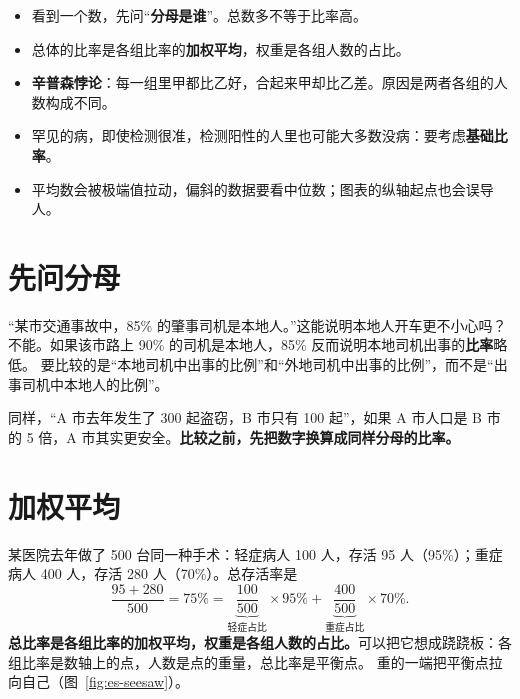 
\begin{keypoints}
\begin{itemize}
  \item 看到一个数，先问“\textbf{分母是谁}”。总数多不等于比率高。
  \item 总体的比率是各组比率的\textbf{加权平均}，权重是各组人数的占比。
  \item \textbf{辛普森悖论}：每一组里甲都比乙好，合起来甲却比乙差。原因是两者各组的人数构成不同。
  \item 罕见的病，即使检测很准，检测阳性的人里也可能大多数没病：要考虑\textbf{基础比率}。
  \item 平均数会被极端值拉动，偏斜的数据要看中位数；图表的纵轴起点也会误导人。
\end{itemize}
\end{keypoints}

\section{先问分母}

“某市交通事故中，85\% 的肇事司机是本地人。”这能说明本地人开车更不小心吗？不能。如果该市路上 90\% 的司机是本地人，85\% 反而说明本地司机出事的\textbf{比率}略低。
要比较的是“本地司机中出事的比例”和“外地司机中出事的比例”，而不是“出事司机中本地人的比例”。

同样，“A 市去年发生了 300 起盗窃，B 市只有 100 起”，如果 A 市人口是 B 市的 5 倍，A 市其实更安全。\textbf{比较之前，先把数字换算成同样分母的比率。}

\section{加权平均}

某医院去年做了 500 台同一种手术：轻症病人 100 人，存活 95 人（95\%）；重症病人 400 人，存活 280 人（70\%）。总存活率是
\[
  \frac{95+280}{500}=75\% = \underbrace{\frac{100}{500}}_{\text{轻症占比}}\times95\%+\underbrace{\frac{400}{500}}_{\text{重症占比}}\times70\%.
\]
\textbf{总比率是各组比率的加权平均，权重是各组人数的占比。}可以把它想成跷跷板：各组比率是数轴上的点，人数是点的重量，总比率是平衡点。
重的一端把平衡点拉向自己（图~\ref{fig:es-seesaw}）。

